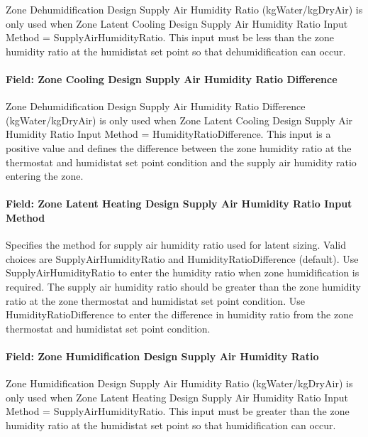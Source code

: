 Zone Dehumidification Design Supply Air Humidity Ratio (kgWater/kgDryAir) is only used when Zone Latent Cooling Design Supply Air Humidity Ratio Input Method =
SupplyAirHumidityRatio. This input must be less than the zone humidity ratio at the humidistat set point so that dehumidification can occur.

\paragraph{Field: Zone Cooling Design Supply Air Humidity Ratio Difference}\label{field-zone-cooling-design-supply-air-humidity-ratio-difference}

Zone Dehumidification Design Supply Air Humidity Ratio Difference (kgWater/kgDryAir) is only used when Zone Latent Cooling Design Supply Air Humidity Ratio Input
Method = HumidityRatioDifference. This input is a positive value and defines the difference between the zone humidity ratio at the thermostat and humidistat set point
condition and the supply air humidity ratio entering the zone.

\paragraph{Field: Zone Latent Heating Design Supply Air Humidity Ratio Input Method}\label{field-zone-latent-heating-design-supply-air-humidity-ratio-input-method}

Specifies the method for supply air humidity ratio used for latent sizing. Valid choices are SupplyAirHumidityRatio and HumidityRatioDifference (default). Use
SupplyAirHumidityRatio to enter the humidity ratio when zone humidification is required. The supply air humidity ratio should be greater than the zone humidity
ratio at the zone thermostat and humidistat set point condition. Use HumidityRatioDifference to enter the difference in humidity ratio from the zone thermostat and
humidistat set point condition.

\paragraph{Field: Zone Humidification Design Supply Air Humidity Ratio}\label{field-zone-humidification-design-supply-air-humidity-ratio}

Zone Humidification Design Supply Air Humidity Ratio (kgWater/kgDryAir) is only used when Zone Latent Heating Design Supply Air Humidity Ratio Input Method =
SupplyAirHumidityRatio. This input must be greater than the zone humidity ratio at the humidistat set point so that humidification can occur.

